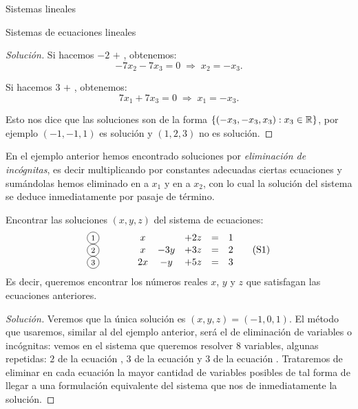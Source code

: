 \begin{chapter}{Sistemas lineales}
\begin{section}{Sistemas de ecuaciones lineales}
\begin{proof}[Solución]
                Si  hacemos $-2$ {\footnotesize{}} $+$  {\footnotesize{}}, obtenemos: 
                $$ -7x_2 - 7x_3 = 0 \;\Rightarrow\; x_2 = -x_3.$$
                
                Si  hacemos $3$ {\footnotesize{}} $+$ {\footnotesize{}}, obtenemos: 
                $$ 7x_1 + 7x_3 = 0 \;\Rightarrow\;  x_1  =  -x_3.$$
                
                Esto nos dice que las soluciones son de la forma $\{(-x_3,-x_3, x_3): x_3 \in \mathbb R \}$, por ejemplo $(-1,-1,1)$ es solución y $(1,2,3)$ no es solución.
            \end{proof}
            
                
            En  el ejemplo anterior hemos encontrado soluciones por \textit{eliminación de incógnitas},  es decir multiplicando por constantes adecuadas  ciertas ecuaciones y sumándolas hemos eliminado en  {\footnotesize{}} a $x_1$ y en  {\footnotesize{}} a $x_2$, con lo cual la solución del sistema se deduce inmediatamente por pasaje de término.   
            
            \begin{ejemplo}\label{ej-sist-2}
                    Encontrar las soluciones $(x,y,z)$ del sistema de ecuaciones:
                    \begin{equation*}
                    \begin{matrix}
                    \text{\footnotesize\circled{1}}&\qquad&x &  & +2z & =& 1 \\
                    \text{\footnotesize\circled{2}}&\qquad&x& -3y & +3z & =&2 \\
                    \text{\footnotesize\circled{3}}&\qquad&2x& -y & +5z & =&3
                    \end{matrix} \tag{S1}
                    \end{equation*}
                    Es decir, queremos encontrar los números reales $x$, $y$ y $z$ que satisfagan las ecuaciones anteriores.
                
            \end{ejemplo}
                
                \begin{proof}[Solución]
                    Veremos que la única solución es $(x,y,z)=(-1,0,1)$.  El  método que usaremos, similar al del ejemplo anterior,  será el de eliminación de variables o incógnitas: vemos  en el sistema que queremos resolver $8$ variables, algunas repetidas: $2$ de la ecuación , $3$ de la ecuación  y $3$ de la ecuación . Trataremos de eliminar en cada ecuación la mayor cantidad de variables posibles de tal forma de llegar a una formulación equivalente del sistema que nos de inmediatamente la solución. 


\end{proof}
\end{section}
\end{chapter}

